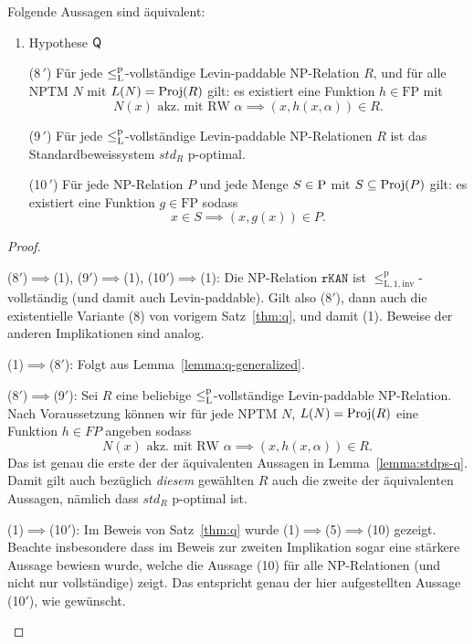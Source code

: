 \begin{theorem}
    Folgende Aussagen sind äquivalent:
    \begin{enumerate}
        \item Hypothese $\hQ$
        \item[(8\,$'\!$)] Für jede $\leqlp$-vollständige Levin-paddable NP-Relation $R$, und für alle NPTM $N$ mit $L(N)=\Proj(R)$ gilt: es existiert eine Funktion $h\in\mathrm{FP}$ mit
            \[ N(x) \text{ akz. mit RW $\alpha$} \implies (x,h(x,\alpha))\in R. \]
        \item[(9\,$'\!$)] Für jede $\leqlp$-vollständige Levin-paddable NP-Relationen $R$ ist das Standardbeweissystem $\mathit{std}_R$ p-optimal.
        \item[(10\,$'\!$)] Für jede NP-Relation $P$ und jede Menge $S\in \P$ mit $S\subseteq \Proj(P)$ gilt: es existiert eine Funktion $g\in\mathrm{FP}$ sodass
            \[ x\in S \implies (x, g(x))\in P. \]
    \end{enumerate}
\end{theorem}
\begin{proof}
\begin{prooflist}
\item (8$'$)$\implies$(1), (9$'$)$\implies$(1), (10$'$)$\implies$(1):
    Die NP-Relation $\mathtt{rKAN}$ ist $\leq_\mathrm{L,1,inv}^\mathrm p$-vollständig (und damit auch Levin-paddable).
    Gilt also (8$'$), dann auch die existentielle Variante (8) von vorigem Satz~\ref{thm:q}, und damit (1).
    Beweise der anderen Implikationen sind analog.

\item (1)$\implies$(8$'$): Folgt aus Lemma~\ref{lemma:q-generalized}.

\item (8$'$)$\implies$(9$'$): Sei $R$ eine beliebige $\leqlp$-vollständige Levin-paddable NP-Relation. Nach Voraussetzung können wir für jede NPTM $N$, $L(N)=\Proj(R)$ eine Funktion $h\in FP$ angeben sodass 
    \[ N(x) \text{ akz. mit RW $\alpha$} \implies (x,h(x,\alpha))\in R. \]
    Das ist genau die erste der der äquivalenten Aussagen in Lemma~\ref{lemma:stdps-q}. Damit gilt auch bezüglich \emph{diesem} gewählten $R$ auch die zweite der äquivalenten Aussagen, nämlich dass $\mathit{std}_R$ p-optimal ist.

\item (1)$\implies$(10$'$): Im Beweis von Satz~\ref{thm:q} wurde (1)$\implies$(5)$\implies$(10) gezeigt. Beachte insbesondere dass im Beweis zur zweiten Implikation sogar eine stärkere Aussage bewiesn wurde, welche die Aussage (10) für alle NP-Relationen (und nicht nur vollständige) zeigt. Das entspricht genau der hier aufgestellten Aussage (10$'$), wie gewünscht.
\end{prooflist}
\end{proof}


